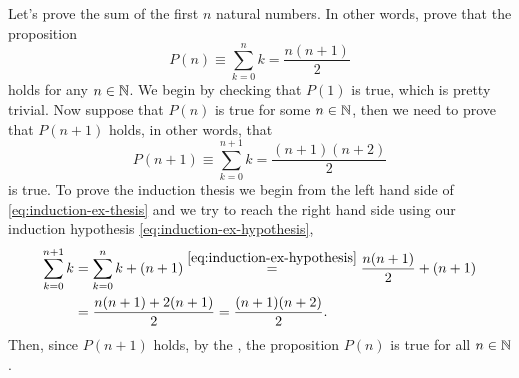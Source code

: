 \begin{example}
    Let's prove the sum of the first $n$ natural numbers. In other words, prove that the proposition
    \begin{equation}\label{eq:induction-ex-hypothesis}
        P(n)\equiv\sum_{k=0}^n k = \frac{n(n + 1)}{2}
    \end{equation}
    holds for any $n\in\N$. We begin by checking that $P(1)$ is true, which is pretty trivial. Now suppose that $P(n)$ is
    true for some $n\in\N$, then we need to prove that $P(n + 1)$ holds, in other words, that
    \begin{equation}\label{eq:induction-ex-thesis}
        P(n + 1)\equiv\sum_{k = 0}^{n + 1} k = \frac{(n + 1)(n + 2)}{2}
    \end{equation}
    is true. To prove the induction thesis we begin from the left hand side of \eqref{eq:induction-ex-thesis} and we try 
    to reach the right hand side using our induction hypothesis \eqref{eq:induction-ex-hypothesis},
    \begin{align}
        \sum_{k=0}^{n+1} k &= \sum_{k=0}^n k + (n + 1) \overset{\eqref{eq:induction-ex-hypothesis}}{=} 
        \frac{n(n + 1)}{2} + (n + 1) \\  &= \frac{n(n + 1) + 2(n + 1)}{2} = \frac{(n + 1)(n + 2)}{2}.
    \end{align}
    Then, since $P(n + 1)$ holds, by the , the proposition $P(n)$ is true for all $n\in\N$.
\end{example}

